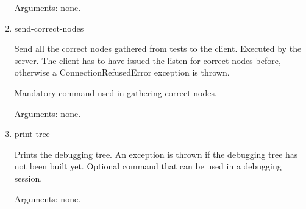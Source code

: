 \begin{enumerate}
Arguments: none.
\item send-correct-nodes
\label{command:send-correct-nodes}

Send all the correct nodes gathered from tests to the client.
Executed by the server.
The client has to have issued the \hyperref[command:listen-for-correct-nodes]{listen-for-correct-nodes} before, otherwise a ConnectionRefusedError exception is thrown.

Mandatory command used in gathering correct nodes.

Arguments: none.
\item print-tree
\label{command:print-tree}

Prints the debugging tree.
An exception is thrown if the debugging tree has not been built yet.
Optional command that can be used in a debugging session.

Arguments: none.
\end{enumerate}

